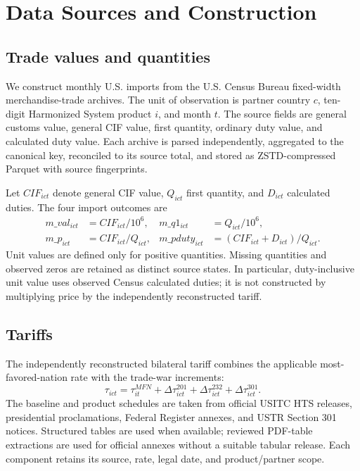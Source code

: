 \section{Data Sources and Construction}

\subsection{Trade values and quantities}

We construct monthly U.S. imports from the U.S. Census Bureau fixed-width merchandise-trade archives. The unit of observation is partner country $c$, ten-digit Harmonized System product $i$, and month $t$. The source fields are general customs value, general CIF value, first quantity, ordinary duty value, and calculated duty value. Each archive is parsed independently, aggregated to the canonical key, reconciled to its source total, and stored as ZSTD-compressed Parquet with source fingerprints.

Let $CIF_{ict}$ denote general CIF value, $Q_{ict}$ first quantity, and $D_{ict}$ calculated duties. The four import outcomes are
\begin{align}
m\_val_{ict}&=CIF_{ict}/10^6,&
m\_q1_{ict}&=Q_{ict}/10^6,\\
m\_p_{ict}&=CIF_{ict}/Q_{ict},&
m\_pduty_{ict}&=(CIF_{ict}+D_{ict})/Q_{ict}.
\end{align}
Unit values are defined only for positive quantities. Missing quantities and observed zeros are retained as distinct source states. In particular, duty-inclusive unit value uses observed Census calculated duties; it is not constructed by multiplying price by the independently reconstructed tariff.

\subsection{Tariffs}

The independently reconstructed bilateral tariff combines the applicable most-favored-nation rate with the trade-war increments:
\begin{equation}
\tau_{ict}=\tau^{MFN}_{it}+\Delta\tau^{201}_{ict}+\Delta\tau^{232}_{ict}+\Delta\tau^{301}_{ict}.
\end{equation}
The baseline and product schedules are taken from official USITC HTS releases, presidential proclamations, Federal Register annexes, and USTR Section 301 notices. Structured tables are used when available; reviewed PDF-table extractions are used for official annexes without a suitable tabular release. Each component retains its source, rate, legal date, and product/partner scope.

